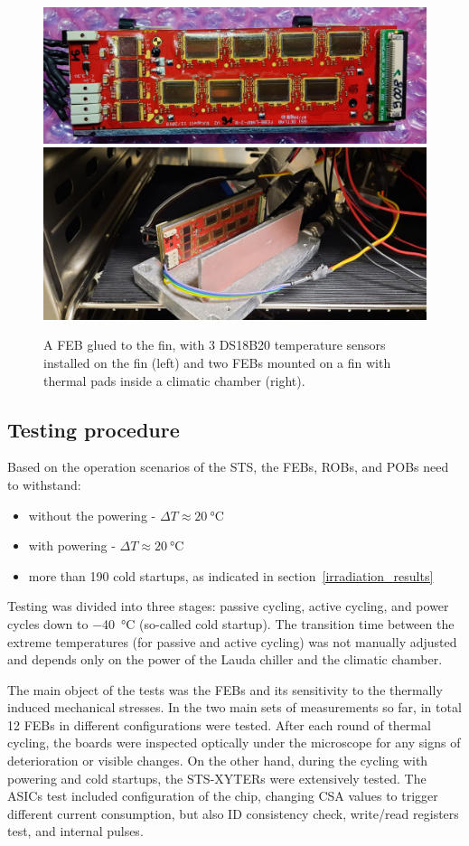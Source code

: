 \begin{figure}[!h]
\centering
\includegraphics[width=0.5\columnwidth]{Chapter4/images/FEBB_T_sensors.jpeg}
\includegraphics[width=0.4\columnwidth]{Chapter4/images/thermal_setup.jpeg}
\caption{A \gls{FEB} glued to the fin, with 3 DS18B20 temperature sensors installed on the fin (left) and two \gls{FEB}s mounted on a fin with thermal pads inside a climatic chamber (right).}
\label{fig_cycling_temps}
\end{figure}

\newpage

\subsection{Testing procedure}
Based on the operation scenarios of the \gls{STS}, the \gls{FEB}s, \gls{ROB}s, and \gls{POB}s need to withstand:
\begin{itemize}
    \item without the powering - $\Delta T\approx\SI{20}{\celsius} $
    \item with powering - $\Delta T\approx\SI{20}{\celsius} $
    \item more than 190 cold startups, as indicated in section~\ref{irradiation_results}
\end{itemize}
Testing was divided into three stages: passive cycling, active cycling, and power cycles down to \SI{-40}{\celsius} (so-called cold startup). The transition time between the extreme temperatures (for passive and active cycling) was not manually adjusted and depends only on the power of the Lauda chiller and the climatic chamber. 

The main object of the tests was the \gls{FEB}s and its sensitivity to the thermally induced mechanical stresses. In the two main sets of measurements so far, in total 12 \gls{FEB}s in different configurations were tested.  After each round of thermal cycling, the boards were inspected optically under the microscope for any signs of deterioration or visible changes. On the other hand, during the cycling with powering and cold startups, the STS-XYTERs were extensively tested. The \glspl{ASIC} test included configuration of the chip, changing \gls{CSA} values to trigger different current consumption, but also ID consistency check, write/read registers test, and internal pulses. 
